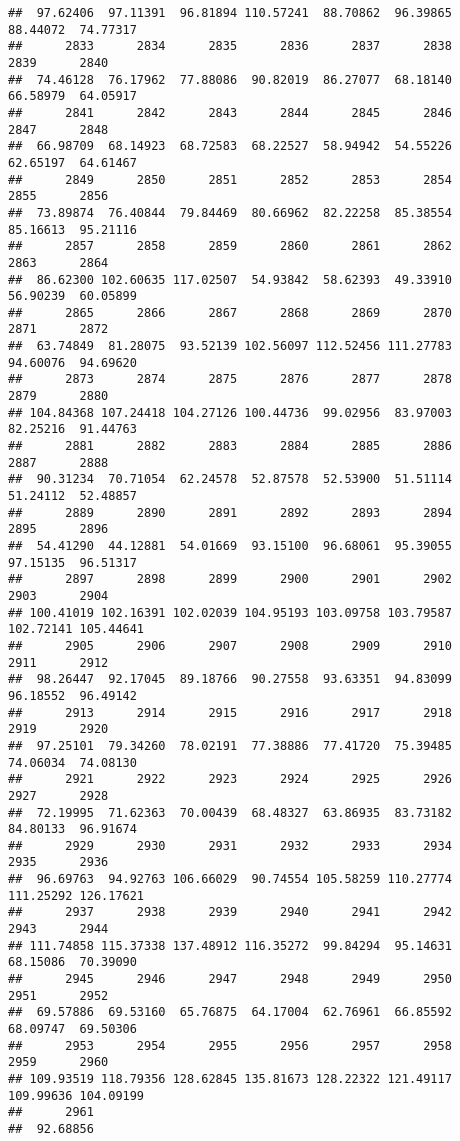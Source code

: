 \documentclass[
]{article}
\begin{document}
\begin{verbatim}
##  97.62406  97.11391  96.81894 110.57241  88.70862  96.39865  88.44072  74.77317 
##      2833      2834      2835      2836      2837      2838      2839      2840 
##  74.46128  76.17962  77.88086  90.82019  86.27077  68.18140  66.58979  64.05917 
##      2841      2842      2843      2844      2845      2846      2847      2848 
##  66.98709  68.14923  68.72583  68.22527  58.94942  54.55226  62.65197  64.61467 
##      2849      2850      2851      2852      2853      2854      2855      2856 
##  73.89874  76.40844  79.84469  80.66962  82.22258  85.38554  85.16613  95.21116 
##      2857      2858      2859      2860      2861      2862      2863      2864 
##  86.62300 102.60635 117.02507  54.93842  58.62393  49.33910  56.90239  60.05899 
##      2865      2866      2867      2868      2869      2870      2871      2872 
##  63.74849  81.28075  93.52139 102.56097 112.52456 111.27783  94.60076  94.69620 
##      2873      2874      2875      2876      2877      2878      2879      2880 
## 104.84368 107.24418 104.27126 100.44736  99.02956  83.97003  82.25216  91.44763 
##      2881      2882      2883      2884      2885      2886      2887      2888 
##  90.31234  70.71054  62.24578  52.87578  52.53900  51.51114  51.24112  52.48857 
##      2889      2890      2891      2892      2893      2894      2895      2896 
##  54.41290  44.12881  54.01669  93.15100  96.68061  95.39055  97.15135  96.51317 
##      2897      2898      2899      2900      2901      2902      2903      2904 
## 100.41019 102.16391 102.02039 104.95193 103.09758 103.79587 102.72141 105.44641 
##      2905      2906      2907      2908      2909      2910      2911      2912 
##  98.26447  92.17045  89.18766  90.27558  93.63351  94.83099  96.18552  96.49142 
##      2913      2914      2915      2916      2917      2918      2919      2920 
##  97.25101  79.34260  78.02191  77.38886  77.41720  75.39485  74.06034  74.08130 
##      2921      2922      2923      2924      2925      2926      2927      2928 
##  72.19995  71.62363  70.00439  68.48327  63.86935  83.73182  84.80133  96.91674 
##      2929      2930      2931      2932      2933      2934      2935      2936 
##  96.69763  94.92763 106.66029  90.74554 105.58259 110.27774 111.25292 126.17621 
##      2937      2938      2939      2940      2941      2942      2943      2944 
## 111.74858 115.37338 137.48912 116.35272  99.84294  95.14631  68.15086  70.39090 
##      2945      2946      2947      2948      2949      2950      2951      2952 
##  69.57886  69.53160  65.76875  64.17004  62.76961  66.85592  68.09747  69.50306 
##      2953      2954      2955      2956      2957      2958      2959      2960 
## 109.93519 118.79356 128.62845 135.81673 128.22322 121.49117 109.99636 104.09199 
##      2961 
##  92.68856
\end{verbatim}
\end{document}
